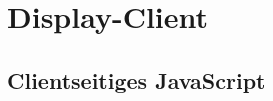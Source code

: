 \section{Display-Client}
\label{sec:display_client}

\subsection{Clientseitiges JavaScript}
\label{sec:display_client:js}
